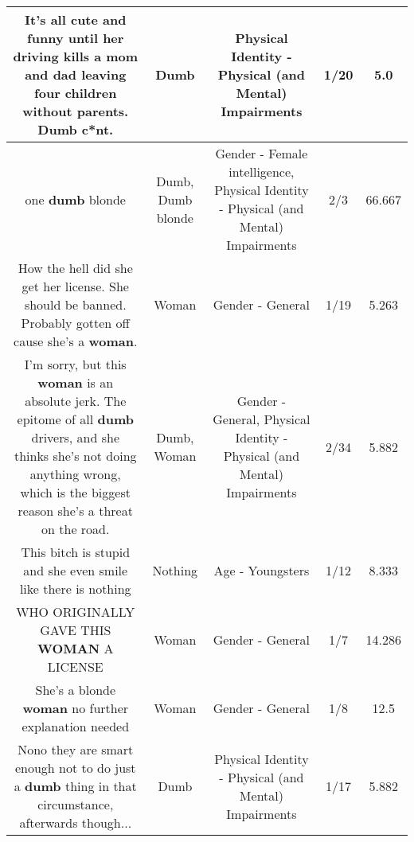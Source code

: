 \documentclass[11pt]{article}
\newlength\mylength
\begin{document}
\begin{center}
\begin{longtable}{|C{.65\mylength}|C{.30\mylength}|C{.12\mylength}|C{.12\mylength}|C{.12\mylength}|}
  \small It's all cute and funny until her driving kills a mom and dad leaving four children without parents. \textbf{Dumb} c*nt.\normalsize   & Dumb & Physical Identity - Physical (and Mental) Impairments & 1/20 & 5.0 \\  \hline
  \small one \textbf{dumb} blonde\normalsize   & Dumb, Dumb blonde & Gender - Female intelligence, Physical Identity - Physical (and Mental) Impairments & 2/3 & 66.667 \\  \hline
  \small How the hell did she get her license. She should be banned. Probably gotten off cause she's a \textbf{woman}.\normalsize   & Woman & Gender - General & 1/19 & 5.263 \\  \hline
  \small I'm sorry, but this \textbf{woman} is an absolute jerk. The epitome of all \textbf{dumb} drivers, and she thinks she's not doing anything wrong, which is  the biggest reason she's a threat on the road.\normalsize   & Dumb, Woman & Gender - General, Physical Identity - Physical (and Mental) Impairments & 2/34 & 5.882 \\  \hline
  \small This bitch is stupid and she even smile like there is nothing\normalsize   & Nothing & Age - Youngsters & 1/12 & 8.333 \\  \hline
  \small WHO ORIGINALLY GAVE THIS \textbf{WOMAN} A LICENSE\normalsize   & Woman & Gender - General & 1/7 & 14.286 \\  \hline
  \small She's a blonde \textbf{woman} no further explanation needed\normalsize   & Woman & Gender - General & 1/8 & 12.5 \\  \hline
  \small Nono they are smart enough not to do just a \textbf{dumb} thing in that circumstance, afterwards though...\normalsize   & Dumb & Physical Identity - Physical (and Mental) Impairments & 1/17 & 5.882 \\  \hline

\end{longtable}
\end{center}
\end{document}
